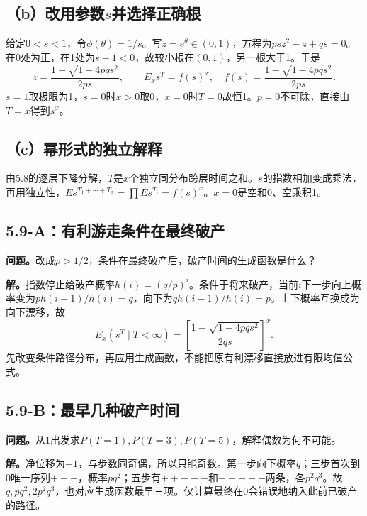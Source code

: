 \documentclass[11pt,a4paper,UTF8,fontset=fandol]{ctexart}
\begin{document}
\subsection{\texorpdfstring{（b）改用参数\(s\)并选择正确根}{（b）改用参数s并选择正确根}}\label{bux6539ux7528ux53c2ux6570sux5e76ux9009ux62e9ux6b63ux786eux6839}

给定\(0<s<1\)，令\(\phi(\theta)=1/s\)。写\(z=e^\theta\in(0,1)\)，方程为\(ps z^2-z+qs=0\)。在0处为正，在1处为\(s-1<0\)，故较小根在\((0,1)\)，另一根大于1。于是
\[z=\frac{1-\sqrt{1-4pqs^2}}{2ps},\qquad
\boxed{E_xs^T=f(s)^x,\quad f(s)=\frac{1-\sqrt{1-4pqs^2}}{2ps}.}\]
\(s=1\)取极限为1，\(s=0\)时\(x>0\)取0，\(x=0\)时\(T=0\)故恒1。\(p=0\)不可除，直接由\(T=x\)得到\(s^x\)。

\subsection{（c）幂形式的独立解释}\label{cux5e42ux5f62ux5f0fux7684ux72ecux7acbux89e3ux91ca}

由5.8的逐层下降分解，\(T\)是\(x\)个独立同分布跨层时间之和。\(s\)的指数相加变成乘法，再用独立性，\(Es^{T_1+\cdots+T_x}=\prod Es^{T_i}=f(s)^x\)。\(x=0\)是空和0、空乘积1。

\subsection{5.9-A：有利游走条件在最终破产}\label{aux6709ux5229ux6e38ux8d70ux6761ux4ef6ux5728ux6700ux7ec8ux7834ux4ea7}

\textbf{问题。}改成\(p>1/2\)，条件在最终破产后，破产时间的生成函数是什么？

\textbf{解。}指数停止给破产概率\(h(i)=(q/p)^i\)。条件于将来破产，当前\(i\)下一步向上概率变为\(p h(i+1)/h(i)=q\)，向下为\(q h(i-1)/h(i)=p\)。上下概率互换成为向下漂移，故
\[\boxed{E_x(s^T\mid T<\infty)=\left[\frac{1-\sqrt{1-4pqs^2}}{2qs}\right]^x.}\]
先改变条件路径分布，再应用生成函数，不能把原有利漂移直接放进有限均值公式。

\subsection{5.9-B：最早几种破产时间}\label{bux6700ux65e9ux51e0ux79cdux7834ux4ea7ux65f6ux95f4}

\textbf{问题。}从1出发求\(P(T=1),P(T=3),P(T=5)\)，解释偶数为何不可能。

\textbf{解。}净位移为\(-1\)，与步数同奇偶，所以只能奇数。第一步向下概率\(q\)；三步首次到0唯一序列\(+--\)，概率\(pq^2\)；五步有\(++---\)和\(+-+--\)两条，各\(p^2q^3\)。故\(\boxed{q,pq^2,2p^2q^3}\)，也对应生成函数最早三项。仅计算最终在0会错误地纳入此前已破产的路径。
\end{document}
